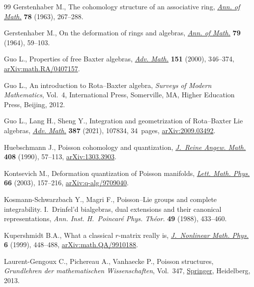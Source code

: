 \documentclass[10pt,a4paper]{amsart}
\numberwithin{equation}{section}
\begin{document}
\begin{thebibliography}{99}
Gerstenhaber M., The cohomology structure of an associative ring, \href{https://doi.org/10.2307/1970343}{\textit{Ann.
 of Math.}} \textbf{78} (1963), 267--288.

Gerstenhaber M., On the deformation of rings and algebras, \href{https://doi.org/10.2307/1970484}{\textit{Ann. of
 Math.}} \textbf{79} (1964), 59--103.

Guo L., Properties of free {B}axter algebras, \href{https://doi.org/10.1006/aima.1999.1898}{\textit{Adv. Math.}} \textbf{151}
 (2000), 346--374, \href{https://arxiv.org/abs/math.RA/0407157}{arXiv:math.RA/0407157}.

Guo L., An introduction to {R}ota--{B}axter algebra, \textit{Surveys of Modern
 Mathematics}, Vol.~4, International Press, Somerville, MA, Higher Education
 Press, Beijing, 2012.

Guo L., Lang H., Sheng Y., Integration and geometrization of {R}ota--{B}axter
 {L}ie algebras, \href{https://doi.org/10.1016/j.aim.2021.107834}{\textit{Adv. Math.}} \textbf{387} (2021), 107834, 34~pages,
 \href{https://arxiv.org/abs/2009.03492}{arXiv:2009.03492}.

Huebschmann J., Poisson cohomology and quantization, \href{https://doi.org/10.1515/crll.1990.408.57}{\textit{J.~Reine Angew.
 Math.}} \textbf{408} (1990), 57--113, \href{https://arxiv.org/abs/1303.3903}{arXiv:1303.3903}.

Kontsevich M., Deformation quantization of {P}oisson manifolds, \href{https://doi.org/10.1023/B:MATH.0000027508.00421.bf}{\textit{Lett.
 Math. Phys.}} \textbf{66} (2003), 157--216, \href{https://arxiv.org/abs/q-alg/9709040}{arXiv:q-alg/9709040}.

Kosmann-Schwarzbach Y., Magri F., Poisson--{L}ie groups and complete
 integrability. {I}.~{D}rinfel'd bialgebras, dual extensions and their
 canonical representations, \textit{Ann. Inst. H.~Poincar\'e Phys. Th\'eor.}
 \textbf{49} (1988), 433--460.

Kupershmidt B.A., What a classical {$r$}-matrix really is, \href{https://doi.org/10.2991/jnmp.1999.6.4.5}{\textit{J.~Nonlinear
 Math. Phys.}} \textbf{6} (1999), 448--488, \href{https://arxiv.org/abs/math.QA/9910188}{arXiv:math.QA/9910188}.

Laurent-Gengoux C., Pichereau A., Vanhaecke P., Poisson structures,
 \textit{Grundlehren der mathematischen Wissenschaften}, Vol.~347, \href{https://doi.org/10.1007/978-3-642-31090-4}{Springer},
 Heidelberg, 2013.


\end{thebibliography}
\end{document}
